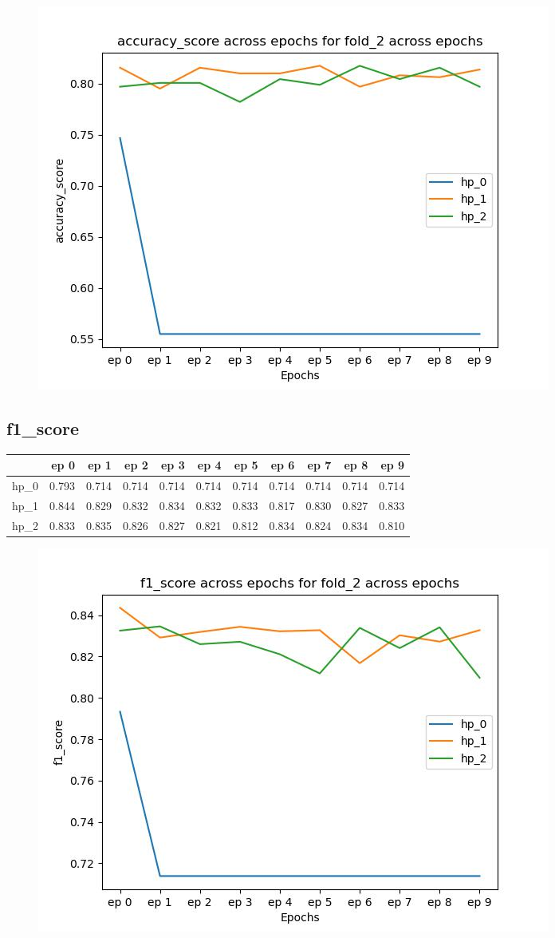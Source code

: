 \documentclass{article}
\begin{document}
\begin{figure}[H]
\includegraphics[scale = 0.75]{fold_2/accuracy_score}
\end{figure}
\subsection{f1\_score}
\begin{tabular}{lrrrrrrrrrr}
\toprule
{} &   ep 0 &   ep 1 &   ep 2 &   ep 3 &   ep 4 &   ep 5 &   ep 6 &   ep 7 &   ep 8 &   ep 9 \\
\midrule
hp\_0 &  0.793 &  0.714 &  0.714 &  0.714 &  0.714 &  0.714 &  0.714 &  0.714 &  0.714 &  0.714 \\
hp\_1 &  0.844 &  0.829 &  0.832 &  0.834 &  0.832 &  0.833 &  0.817 &  0.830 &  0.827 &  0.833 \\
hp\_2 &  0.833 &  0.835 &  0.826 &  0.827 &  0.821 &  0.812 &  0.834 &  0.824 &  0.834 &  0.810 \\
\bottomrule
\end{tabular}

\begin{figure}[H]
\includegraphics[scale = 0.75]{fold_2/f1_score}
\end{figure}
\end{document}
